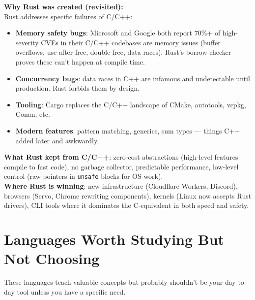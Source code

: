 \documentclass[11pt, letterpaper]{article}
\begin{document}
\begin{tcolorbox}[colback=partbg, colframe=sectionblue, arc=3pt, boxrule=1pt]
\textbf{Why Rust was created (revisited):}\\[4pt]
Rust addresses specific failures of C/C++:
\begin{itemize}[noitemsep, leftmargin=*]
  \item \textbf{Memory safety bugs}: Microsoft and Google both report 70\%+ of high-severity CVEs in their C/C++ codebases are memory issues (buffer overflows, use-after-free, double-free, data races). Rust's borrow checker proves these can't happen at compile time.
  \item \textbf{Concurrency bugs}: data races in C++ are infamous and undetectable until production. Rust forbids them by design.
  \item \textbf{Tooling}: Cargo replaces the C/C++ landscape of CMake, autotools, vcpkg, Conan, etc.
  \item \textbf{Modern features}: pattern matching, generics, sum types --- things C++ added later and awkwardly.
\end{itemize}
\textbf{What Rust kept from C/C++}: zero-cost abstractions (high-level features compile to fast code), no garbage collector, predictable performance, low-level control (raw pointers in \texttt{unsafe} blocks for OS work).\\[4pt]
\textbf{Where Rust is winning}: new infrastructure (Cloudflare Workers, Discord), browsers (Servo, Chrome rewriting components), kernels (Linux now accepts Rust drivers), CLI tools where it dominates the C-equivalent in both speed and safety.
\end{tcolorbox}

\section*{Languages Worth Studying But Not Choosing}

These languages teach valuable concepts but probably shouldn't be your day-to-day tool unless you have a specific need.
\end{document}
